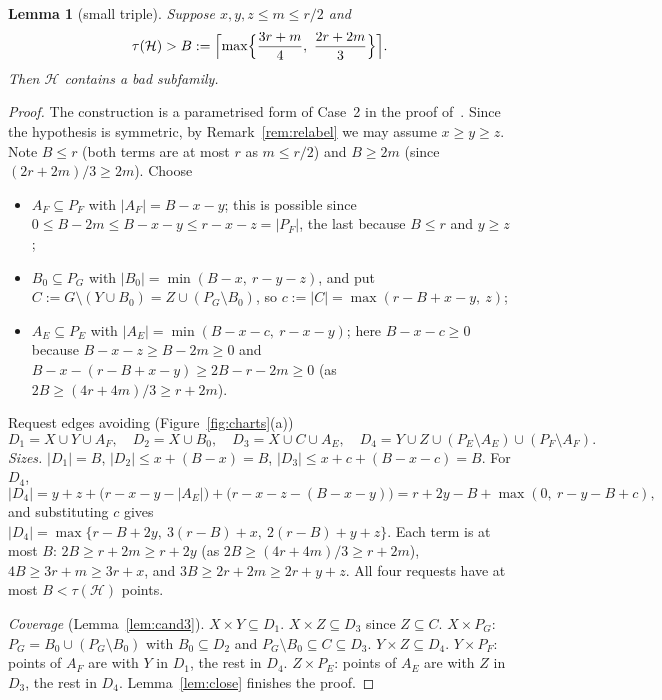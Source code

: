 \documentclass[11pt]{amsart}
\newtheorem{lemma}[theorem]{Lemma}
\theoremstyle{definition}
\theoremstyle{remark}
\newcommand{\cH}{\mathcal H}
\begin{document}
\begin{lemma}[small triple]\label{lem:L18}
Suppose $x,y,z\le m\le r/2$ and
\[
\tau(\cH)>B:=\Bigl\lceil\max\Bigl\{\frac{3r+m}{4},\ \frac{2r+2m}{3}\Bigr\}\Bigr\rceil .
\]
Then $\cH$ contains a bad subfamily.
\end{lemma}
\begin{proof}
The construction is a parametrised form of Case~2 in the proof of~\cite[Lemma~1]{FKW}. Since the hypothesis is symmetric, by Remark~\ref{rem:relabel} we may assume $x\ge y\ge z$. Note $B\le r$ (both terms are at most $r$ as $m\le r/2$) and $B\ge 2m$ (since $(2r+2m)/3\ge2m$). Choose
\begin{itemize}
\item $A_F\subseteq P_F$ with $|A_F|=B-x-y$; this is possible since $0\le B-2m\le B-x-y\le r-x-z=|P_F|$, the last because $B\le r$ and $y\ge z$;
\item $B_0\subseteq P_G$ with $|B_0|=\min(B-x,\ r-y-z)$, and put $C:=G\setminus(Y\cup B_0)=Z\cup(P_G\setminus B_0)$, so $c:=|C|=\max(r-B+x-y,\ z)$;
\item $A_E\subseteq P_E$ with $|A_E|=\min(B-x-c,\ r-x-y)$; here $B-x-c\ge0$ because $B-x-z\ge B-2m\ge0$ and $B-x-(r-B+x-y)\ge 2B-r-2m\ge0$ (as $2B\ge(4r+4m)/3\ge r+2m$).
\end{itemize}
Request edges avoiding (Figure~\ref{fig:charts}(a))
\[
D_1=X\cup Y\cup A_F,\quad D_2=X\cup B_0,\quad D_3=X\cup C\cup A_E,\quad D_4=Y\cup Z\cup(P_E\setminus A_E)\cup(P_F\setminus A_F).
\]
\emph{Sizes.} $|D_1|=B$, $|D_2|\le x+(B-x)=B$, $|D_3|\le x+c+(B-x-c)=B$. For $D_4$,
\[
|D_4|=y+z+\bigl(r-x-y-|A_E|\bigr)+\bigl(r-x-z-(B-x-y)\bigr)=r+2y-B+\max(0,\ r-y-B+c),
\]
and substituting $c$ gives $|D_4|=\max\{r-B+2y,\ 3(r-B)+x,\ 2(r-B)+y+z\}$. Each term is at most $B$: $2B\ge r+2m\ge r+2y$ (as $2B\ge(4r+4m)/3\ge r+2m$), $4B\ge3r+m\ge3r+x$, and $3B\ge2r+2m\ge2r+y+z$. All four requests have at most $B<\tau(\cH)$ points.

\emph{Coverage} (Lemma~\ref{lem:cand3}). $X\times Y\subseteq D_1$. $X\times Z\subseteq D_3$ since $Z\subseteq C$. $X\times P_G$: $P_G=B_0\cup(P_G\setminus B_0)$ with $B_0\subseteq D_2$ and $P_G\setminus B_0\subseteq C\subseteq D_3$. $Y\times Z\subseteq D_4$. $Y\times P_F$: points of $A_F$ are with $Y$ in $D_1$, the rest in $D_4$. $Z\times P_E$: points of $A_E$ are with $Z$ in $D_3$, the rest in $D_4$. Lemma~\ref{lem:close} finishes the proof.
\end{proof}
\end{document}
